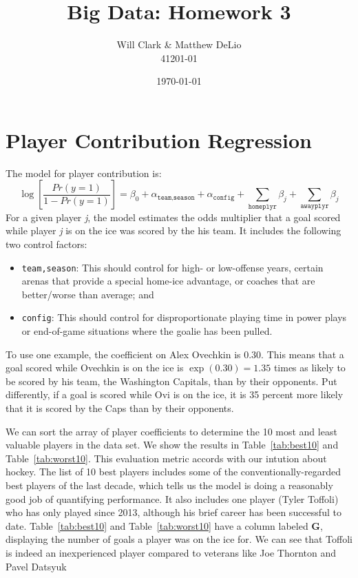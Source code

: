 \documentclass[11pt, fleqn]{article}
\begin{document}
\title{Big Data: Homework 3}
\author{Will Clark \& Matthew DeLio \\ 41201-01}
\date{\today}
\maketitle

\section{Player Contribution Regression}

The model for player contribution is:
\[ \log\left[\frac{Pr(y=1)}{1-Pr(y=1)}\right] = \beta_0 + \alpha_{\texttt{team,season}} + \alpha_{\texttt{config}} + \sum_{\texttt{homeplyr}} \beta_j + \sum_{\texttt{awayplyr}} \beta_j \]
For a given player \textit{j}, the model estimates the odds multiplier that a goal scored while player \textit{j} is on the ice was scored by the his team. It includes the following two control factors:
\begin{itemize}
  \item \texttt{team,season}: This should control for high- or low-offense years, certain arenas that provide a special home-ice advantage, or coaches that are better/worse than average; and
  \item \texttt{config}: This should control for disproportionate playing time in power plays or end-of-game situations where the goalie has been pulled.
\end{itemize}
To use one example, the coefficient on Alex Ovechkin is 0.30. This means that a goal scored while Ovechkin is on the ice is $\exp(0.30)=1.35$ times as likely to be scored by his team, the Washington Capitals, than by their opponents. Put differently, if a goal is scored while Ovi is on the ice, it is 35 percent more likely that it is scored by the Caps than by their opponents.

We can sort the array of player coefficients to determine the 10 most and least valuable players in the data set. We show the results in Table~\ref{tab:best10} and Table~\ref{tab:worst10}. This evaluation metric accords with our intution about hockey. The list of 10 best players includes some of the conventionally-regarded best players of the last decade, which tells us the model is doing a reasonably good job of quantifying performance. It also includes one player (Tyler Toffoli) who has only played since 2013, although his brief career has been successful to date. Table~\ref{tab:best10} and Table~\ref{tab:worst10} have a column labeled \textbf{G}, displaying the number of goals a player was on the ice for. We can see that Toffoli is indeed an inexperienced player compared to veterans like Joe Thornton and Pavel Datsyuk
\end{document}
